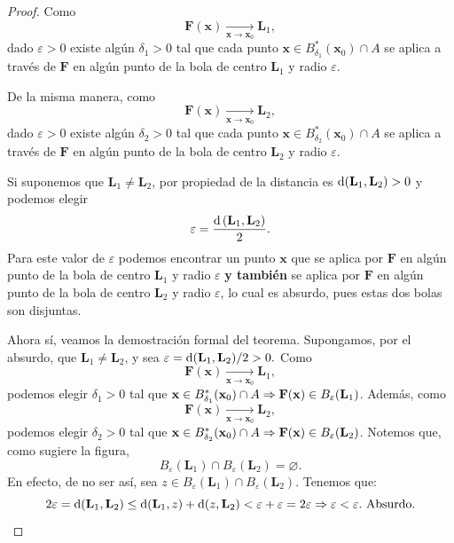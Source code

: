 \begin{proof}  Como 
\[
 \mathbf{F}(\mathbf{x}) \xrightarrow[\mathbf{x} \to \mathbf{x}_0]{} \mathbf{L}_1,
\]
dado $\varepsilon > 0$ existe alg\'un $\delta_1 > 0$ tal que cada punto $\mathbf{x} \in B_{\delta_1}^*(\mathbf{x}_0) \cap A$ se aplica a trav\'es de $\mathbf{F}$ en alg\'un punto de la bola de centro $\mathbf{L}_1$ y radio $\varepsilon$.

\def\Ro{2.0}
\def\Rb{1.0}
\def\Ra{3.0}
\def\sep{1.0*\Ro}



De la misma manera, como 
\[
 \mathbf{F}(\mathbf{\mathbf{x}}) \xrightarrow[\mathbf{\mathbf{x}} \to \mathbf{\mathbf{x}}_0]{} \mathbf{L}_2,
\]
dado $\varepsilon > 0$ existe alg\'un $\delta_2 > 0$ tal que cada punto $\mathbf{\mathbf{x}} \in B_{\delta_2}^*(\mathbf{\mathbf{x}}_0) \cap A$ se aplica a trav\'es de $\mathbf{F}$ en alg\'un punto de la bola de centro $\mathbf{L}_2$ y radio $\varepsilon$.



Si suponemos que $\mathbf{L}_1 \ne \mathbf{L}_2$, por propiedad de la distancia es $\operatorname{d}(\mathbf{L}_1,\mathbf{L}_2) > 0$ y podemos elegir 
\[
 \varepsilon = \frac{\operatorname{d}{(\mathbf{L}_1,\mathbf{L}_2)}}{2}.
\]
Para este valor de $\varepsilon$ podemos encontrar un punto $\mathbf{\mathbf{x}}$ que se aplica por $\mathbf{F}$ en alg\'un punto de la bola de centro $\mathbf{L}_1$ y radio $\varepsilon$ \textbf{y tambi\'en} se aplica por $\mathbf{F}$ en alg\'un punto de la bola de centro $\mathbf{L}_2$ y radio $\varepsilon$, lo cual es absurdo, pues estas dos bolas son disjuntas.



Ahora s\'i, veamos la demostraci\'on formal del teorema.  Supongamos, por el absurdo, que $\mathbf{L}_1 \ne \mathbf{L}_2$, y sea $\varepsilon = \operatorname{d}(\mathbf{L}_1,\mathbf{L}_2)/2 > 0.$  Como 
 \[
  \mathbf{F}(\mathbf{x}) \xrightarrow[\mathbf{x} \to \mathbf{x}_0]{} \mathbf{L}_1,
 \]
podemos elegir $\delta_1 > 0$ tal que $\mathbf{x} \in B_{\delta_1}^*(\mathbf{x}_0) \cap A \Rightarrow \mathbf{F}(\mathbf{x}) \in B_{\varepsilon}(\mathbf{L}_1)$. Adem\'as, como 
\[
 \mathbf{F}(\mathbf{x}) \xrightarrow[\mathbf{x} \to \mathbf{x}_0]{} \mathbf{L}_2,
\]
 podemos elegir $\delta_2 > 0$ tal que $\mathbf{x} \in B_{\delta_2}^*(\mathbf{x}_0) \cap A \Rightarrow \mathbf{F}(\mathbf{x}) \in B_{\varepsilon}(\mathbf{L}_2)$.  Notemos que, como sugiere la figura, 
 \[
  B_{\varepsilon}(\mathbf{L}_1) \cap B_{\varepsilon}(\mathbf{L}_2) = \varnothing.
 \]
 En efecto, de no ser as\'i, sea $z \in B_{\varepsilon}(\mathbf{L}_1) \cap B_{\varepsilon}(\mathbf{L}_2)$. Tenemos que:
 \[
  2 \varepsilon = \operatorname{d}(\mathbf{L}_1,\mathbf{L}_2) \le \operatorname{d}(\mathbf{L}_1,z) + \operatorname{d}(z,\mathbf{L}_2)
  < \varepsilon + \varepsilon = 2 \varepsilon \Rightarrow \varepsilon < \varepsilon. \text{ Absurdo.}
 \]


\end{proof}
